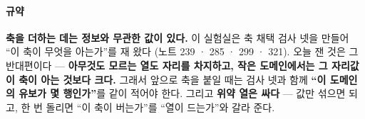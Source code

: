 \documentclass[10pt]{article}
\begin{document}
\paragraph{규약} \textbf{축을 더하는 데는 정보와 무관한 값이 있다.}
이 실험실은 축 채택 검사 넷을 만들어 ``이 축이 무엇을 아는가''를 재 왔다
(노트 239 · 285 · 299 · 321). 오늘 잰 것은 그 반대편이다 --- \textbf{아무것도
모르는 열도 자리를 차지하고, 작은 도메인에서는 그 자리값이 축이 아는
것보다 크다.} 그래서 앞으로 축을 붙일 때는 검사 넷과 함께
\textbf{``이 도메인의 유보가 몇 행인가''}를 같이 적어야 한다. 그리고
\textbf{위약 열은 싸다} --- 값만 섞으면 되고, 한 번 돌리면 ``이 축이 버는가''를
``열이 드는가''와 갈라 준다.
\end{document}
